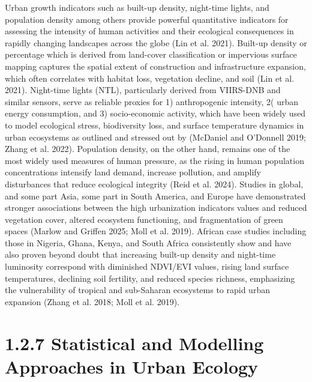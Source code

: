 Urban growth indicators such as built-up density, night-time lights, and population density among others provide powerful quantitative indicators for assessing the intensity of human activities and their ecological consequences in rapidly changing landscapes across the globe (Lin et al. 2021). Built-up density or percentage which is derived from land-cover classification or impervious surface mapping captures the spatial extent of construction and infrastructure expansion, which often correlates with habitat loss, vegetation decline, and soil (Lin et al. 2021). Night-time lights (NTL), particularly derived from VIIRS-DNB and similar sensors, serve as reliable proxies for 1) anthropogenic intensity, 2( urban energy consumption, and 3) socio-economic activity, which have been widely used to model ecological stress, biodiversity loss, and surface temperature dynamics in urban ecosystems as outlined and stressed out by (McDaniel and O'Donnell 2019; Zhang et al. 2022). Population density, on the other hand, remains one of the most widely used measures of human pressure, as the rising in human population concentrations intensify land demand, increase pollution, and amplify disturbances that reduce ecological integrity (Reid et al. 2024). Studies in global, and some part Asia, some part in South America, and Europe have demonstrated stronger associations between the high urbanization indicators values and reduced vegetation cover, altered ecosystem functioning, and fragmentation of green spaces (Marlow and Griffen 2025; Moll et al. 2019). African case studies including those in Nigeria, Ghana, Kenya, and South Africa consistently show and have also proven beyond doubt that increasing built-up density and night-time luminosity correspond with diminished NDVI/EVI values, rising land surface temperatures, declining soil fertility, and reduced species richness, emphasizing the vulnerability of tropical and sub-Saharan ecosystems to rapid urban expansion (Zhang et al. 2018; Moll et al. 2019).
\hypertarget{statistical-and-modelling-approaches-in-urban-ecology}{%
\section{\texorpdfstring{\textbf{1.2.7 Statistical and Modelling Approaches in Urban Ecology}}{1.2.7 Statistical and Modelling Approaches in Urban Ecology}}\label{statistical-and-modelling-approaches-in-urban-ecology}}

